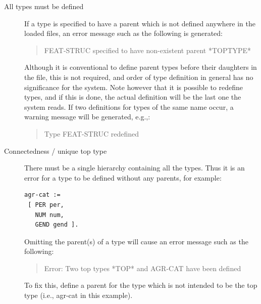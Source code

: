 \documentclass[12pt]{report}
\newenvironment{error}%
{\begin{quote}
\tt
}%
{\end{quote}
}
\newenvironment{warning}%
{\begin{quote}
\tt
}%
{\end{quote}
}
\begin{document}
\label{typehcond}
\begin{description}
\item[All types must be defined]
If a type is specified to have a parent which is not defined anywhere in the
loaded files, an error message such as the following is generated:
\begin{error}
FEAT-STRUC specified to have non-existent parent *TOPTYPE*
\end{error}
Although it is conventional to define parent types before their 
daughters in the file, this is not required, and order of type definition
in general has no significance for the system.
Note however that it is possible to redefine types, and if this is done, the
actual definition will be the last one the system reads.
If two definitions for types of the same name occur,
a warning message will be generated, e.g.,:
\begin{warning}
Type FEAT-STRUC redefined
\end{warning}
\item[Connectedness / unique top type]
There must be a single hierarchy containing all the types.
Thus it is an error for a type to be defined without any parents,
for example:
\begin{verbatim}
agr-cat := 
 [ PER per,
   NUM num,
   GEND gend ]. 
\end{verbatim}
Omitting the parent(s) of a type will cause an error message such as
the following:
\begin{error}
Error: Two top types *TOP* and AGR-CAT have been defined
\end{error}
To fix this, define a parent for the type which is not intended to be
the top type (i.e., {\type agr-cat} in this example).


\end{description}
\end{document}
